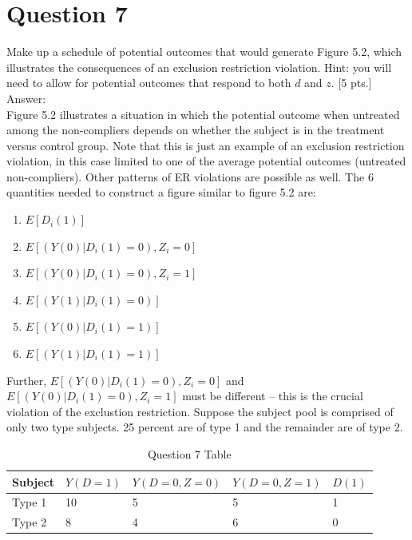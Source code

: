 \documentclass[11pt,notitlepage]{article}\usepackage[]{graphicx}\usepackage[]{color}
\begin{document}
\section*{Question 7}
Make up a schedule of potential outcomes that would generate Figure 5.2, which illustrates the consequences of an exclusion restriction violation. Hint: you will need to allow for potential outcomes that respond to both $d$ and $z$. [5 pts.]\\
Answer:\\
Figure 5.2 illustrates a situation in which the potential outcome when untreated among the non-compliers depends on whether the subject is in the treatment versus control group. Note that this is just an example of an exclusion restriction violation, in this case limited to one of the average potential outcomes (untreated non-compliers). Other patterns of ER violations are possible as well.
The 6 quantities needed to construct a figure similar to figure 5.2 are: 
\begin{enumerate}
\item $E[D_i(1)]$
\item $E[(Y(0)|D_i(1) = 0), Z_i = 0]$
\item $E[(Y(0)|D_i(1) = 0), Z_i = 1]$
\item $E[(Y(1)|D_i(1) = 0)]$
\item $E[(Y(0)|D_i(1) = 1)]$
\item $E[(Y(1)|D_i(1) = 1)]$
\end{enumerate}
Further, $E[(Y(0)|D_i(1) = 0), Z_i = 0]$ and $E[(Y(0)|D_i(1) = 0), Z_i = 1]$ must be different -- this is the crucial violation of the exclustion restriction. Suppose the subject pool is comprised of only two type subjects. 25 percent are of type 1 and the remainder are of type 2.

\begin{table}[H]
  \centering
  \caption{Question 7 Table}
    \begin{tabular}{lllll}
    \toprule
    Subject  & $Y(D=1)$ & $Y(D=0, Z=0)$ & $Y(D=0, Z=1)$ & $D(1)$ \\
    \midrule
    Type 1 & 10    & 5     & 5     & 1 \\
    Type 2 & 8     & 4     & 6     & 0 \\
    \bottomrule
    \end{tabular}%
  \label{tab:addlabel}%
\end{table}%
\end{document}
